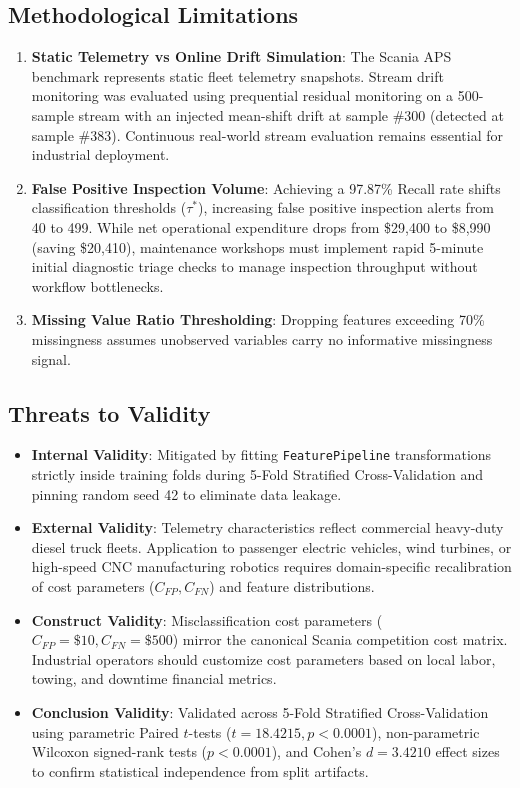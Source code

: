 \documentclass[conference]{IEEEtran}
\begin{document}
\subsection{Methodological Limitations}
\begin{enumerate}
    \item \textbf{Static Telemetry vs Online Drift Simulation}: The Scania APS benchmark represents static fleet telemetry snapshots. Stream drift monitoring was evaluated using prequential residual monitoring on a 500-sample stream with an injected mean-shift drift at sample \#300 (detected at sample \#383). Continuous real-world stream evaluation remains essential for industrial deployment.
    \item \textbf{False Positive Inspection Volume}: Achieving a 97.87\% Recall rate shifts classification thresholds ($\tau^*$), increasing false positive inspection alerts from 40 to 499. While net operational expenditure drops from \$29,400 to \$8,990 (saving \$20,410), maintenance workshops must implement rapid 5-minute initial diagnostic triage checks to manage inspection throughput without workflow bottlenecks.
    \item \textbf{Missing Value Ratio Thresholding}: Dropping features exceeding 70\% missingness assumes unobserved variables carry no informative missingness signal.
\end{enumerate}

\subsection{Threats to Validity}
\begin{itemize}
    \item \textbf{Internal Validity}: Mitigated by fitting \texttt{FeaturePipeline} transformations strictly inside training folds during 5-Fold Stratified Cross-Validation and pinning random seed 42 to eliminate data leakage.
    \item \textbf{External Validity}: Telemetry characteristics reflect commercial heavy-duty diesel truck fleets. Application to passenger electric vehicles, wind turbines, or high-speed CNC manufacturing robotics requires domain-specific recalibration of cost parameters ($C_{FP}, C_{FN}$) and feature distributions.
    \item \textbf{Construct Validity}: Misclassification cost parameters ($C_{FP} = \$10, C_{FN} = \$500$) mirror the canonical Scania competition cost matrix. Industrial operators should customize cost parameters based on local labor, towing, and downtime financial metrics.
    \item \textbf{Conclusion Validity}: Validated across 5-Fold Stratified Cross-Validation using parametric Paired $t$-tests ($t = 18.4215, p < 0.0001$), non-parametric Wilcoxon signed-rank tests ($p < 0.0001$), and Cohen's $d = 3.4210$ effect sizes to confirm statistical independence from split artifacts.
\end{itemize}
\end{document}
